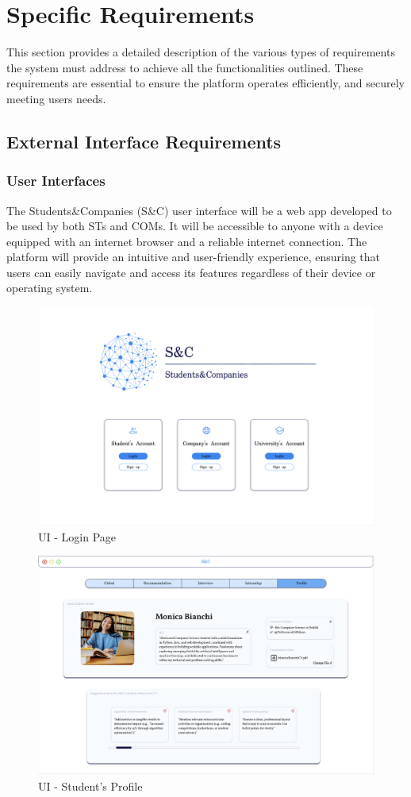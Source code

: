 
\chapter{Specific Requirements}
This section provides a detailed description of the various types of requirements the system must address to achieve all the functionalities outlined. These requirements are essential to ensure the platform operates efficiently, and securely meeting users needs. 

\section{External Interface Requirements}
\subsection{User Interfaces}
The Students\&Companies (S\&C) user interface will be a web app developed to be used by both STs and COMs. It will be accessible to anyone with a device equipped with an internet browser and a reliable internet connection. The platform will provide an intuitive and user-friendly experience, ensuring that users can easily navigate and access its features regardless of their device or operating system.

\begin{figure}[H]
    \centering
    \includegraphics[width=0.8\linewidth]{RASD//Images/UI-Login Page.png}
    \caption{UI - Login Page}
\end{figure}

\begin{figure}[H]
    \centering
    \includegraphics[width=0.8\linewidth]{RASD//Images/UI - Student's Profile.png}
    \caption{UI - Student's Profile}
\end{figure}

